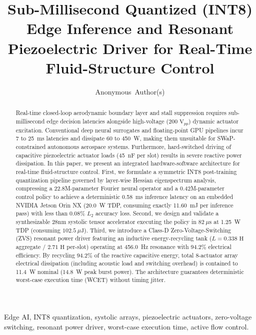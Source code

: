 \documentclass[journal,10pt,twocolumn]{IEEEtran}
\begin{document}
\title{Sub-Millisecond Quantized (INT8) Edge Inference and Resonant Piezoelectric Driver for Real-Time Fluid-Structure Control}

\author{Anonymous~Author(s)}


\maketitle

\begin{abstract}
Real-time closed-loop aerodynamic boundary layer and stall suppression requires sub-millisecond edge decision latencies alongside high-voltage ($200\text{ V}_{pp}$) dynamic actuator excitation. Conventional deep neural surrogates and floating-point GPU pipelines incur 7 to 25~ms latencies and dissipate 60 to 450~W, making them unsuitable for SWaP-constrained autonomous aerospace systems. Furthermore, hard-switched driving of capacitive piezoelectric actuator loads (45~nF per slot) results in severe reactive power dissipation. In this paper, we present an integrated hardware-software architecture for real-time fluid-structure control. First, we formulate a symmetric INT8 post-training quantization pipeline governed by layer-wise Hessian eigenspectrum analysis, compressing a 22.8M-parameter Fourier neural operator and a 0.42M-parameter control policy to achieve a deterministic 0.58~ms inference latency on an embedded NVIDIA Jetson Orin NX (20.0~W TDP, consuming exactly 11.60~mJ per inference pass) with less than 0.08\% $L_2$ accuracy loss. Second, we design and validate a synthesizable 28nm systolic tensor accelerator executing the policy in $82\ \mu\text{s}$ at 1.25~W TDP (consuming $102.5\ \mu\text{J}$). Third, we introduce a Class-D Zero-Voltage-Switching (ZVS) resonant power driver featuring an inductive energy-recycling tank ($L = 0.338\text{ H}$ aggregate / $2.71\text{ H}$ per-slot) operating at 456.0~Hz resonance with 94.2\% electrical efficiency. By recycling 94.2\% of the reactive capacitive energy, total 8-actuator array electrical dissipation (including acoustic load and switching overhead) is contained to 11.4~W nominal (14.8~W peak burst power). The architecture guarantees deterministic worst-case execution time (WCET) without timing jitter.
\end{abstract}

\begin{IEEEkeywords}
Edge AI, INT8 quantization, systolic arrays, piezoelectric actuators, zero-voltage switching, resonant power driver, worst-case execution time, active flow control.
\end{IEEEkeywords}
\end{document}
